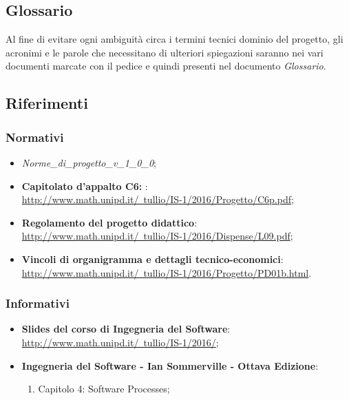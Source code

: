 	\subsection{Glossario}
	Al fine di evitare ogni ambiguità circa i termini tecnici dominio del progetto, gli acronimi e le parole che necessitano di ulteriori spiegazioni saranno nei vari documenti marcate con il pedice \gloss{} e quindi presenti nel documento \textit{Glossario}.
	\subsection{Riferimenti}
		\subsubsection{Normativi}
		\begin{itemize}
			\item \textit{Norme_di_progetto_v_1_0_0};
			\item \textbf{Capitolato d'appalto C6: \proj}:
			\\ \href{http://www.math.unipd.it/~tullio/IS-1/2016/Progetto/C6p.pdf}{http://www.math.unipd.it/~tullio/IS-1/2016/Progetto/C6p.pdf};
			\item \textbf{Regolamento del progetto didattico}:
			\\ \href{http://www.math.unipd.it/~tullio/IS-1/2016/Dispense/L09.pdf}{http://www.math.unipd.it/~tullio/IS-1/2016/Dispense/L09.pdf};
			\item \textbf{Vincoli di organigramma e dettagli tecnico-economici}:
			\\ \href{http://www.math.unipd.it/~tullio/IS-1/2016/Progetto/PD01b.html}{http://www.math.unipd.it/~tullio/IS-1/2016/Progetto/PD01b.html}.
			\
		\end{itemize}
		\subsubsection{Informativi}
		\begin{itemize}
			\item \textbf{Slides del corso di Ingegneria del Software}:
			\\ \href{http://www.math.unipd.it/~tullio/IS-1/2016/}{http://www.math.unipd.it/~tullio/IS-1/2016/};
			\item \textbf{Ingegneria del Software - Ian Sommerville - Ottava Edizione}:
			\begin{enumerate}
				\item Capitolo 4: Software Processes;
			\end{enumerate}
		\end{itemize}

